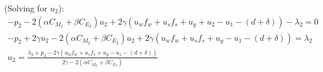 \documentclass[12pt]{article}
\begin{document}
(Solving for $u_2$):
\begin{align*}
    - p_2 - 2(\alpha C_{M_2} + \beta C_{E_2})u_2 + 2\gamma (u_w f_w + u_s f_s + u_g + u_2 - u_1 - (d + \delta)) - \lambda_2 = 0 \\
    - p_2 + 2\gamma u_2 - 2(\alpha C_{M_2} + \beta C_{E_2})u_2 + 2\gamma (u_w f_w + u_s f_s + u_g - u_1 - (d + \delta)) = \lambda_2 \\
    u_2 = \frac{\lambda_2 + p_2 - 2\gamma (u_w f_w + u_s f_s + u_g - u_1 - (d + \delta))}{2\gamma - 2(\alpha C_{M_2} + \beta C_{E_2})} \\
\end{align*}
\end{document}

